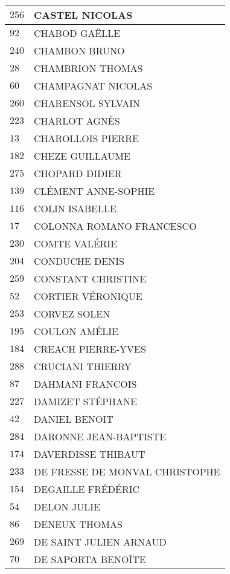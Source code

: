 \begin{xltabular}{\linewidth}{|l|X|}
    \hline
    $256$ & CASTEL NICOLAS \\
    \hline
    $92$ & CHABOD GAËLLE \\
    \hline
    $240$ & CHAMBON BRUNO \\
    \hline
    $28$ & CHAMBRION THOMAS \\
    \hline
    $60$ & CHAMPAGNAT NICOLAS \\
    \hline
    $260$ & CHARENSOL SYLVAIN \\
    \hline
    $223$ & CHARLOT AGNÈS \\
    \hline
    $13$ & CHAROLLOIS PIERRE \\
    \hline
    $182$ & CHEZE GUILLAUME \\
    \hline
    $275$ & CHOPARD DIDIER \\
    \hline
    $139$ & CLÉMENT ANNE-SOPHIE \\
    \hline
    $116$ & COLIN ISABELLE \\
    \hline
    $17$ & COLONNA ROMANO FRANCESCO \\
    \hline
    $230$ & COMTE VALÉRIE \\
    \hline
    $204$ & CONDUCHE DENIS \\
    \hline
    $259$ & CONSTANT CHRISTINE \\
    \hline
    $52$ & CORTIER VÉRONIQUE \\
    \hline
    $253$ & CORVEZ SOLEN \\
    \hline
    $195$ & COULON AMÉLIE \\
    \hline
    $184$ & CREACH PIERRE-YVES \\
    \hline
    $288$ & CRUCIANI THIERRY \\
    \hline
    $87$ & DAHMANI FRANCOIS \\
    \hline
    $227$ & DAMIZET STÉPHANE \\
    \hline
    $42$ & DANIEL BENOIT \\
    \hline
    $284$ & DARONNE JEAN-BAPTISTE \\
    \hline
    $174$ & DAVERDISSE THIBAUT \\
    \hline
    $233$ & DE FRESSE DE MONVAL CHRISTOPHE \\
    \hline
    $154$ & DEGAILLE FRÉDÉRIC \\
    \hline
    $54$ & DELON JULIE \\
    \hline
    $86$ & DENEUX THOMAS \\
    \hline
    $269$ & DE SAINT JULIEN ARNAUD \\
    \hline
    $70$ & DE SAPORTA BENOÎTE \\

\end{xltabular}

